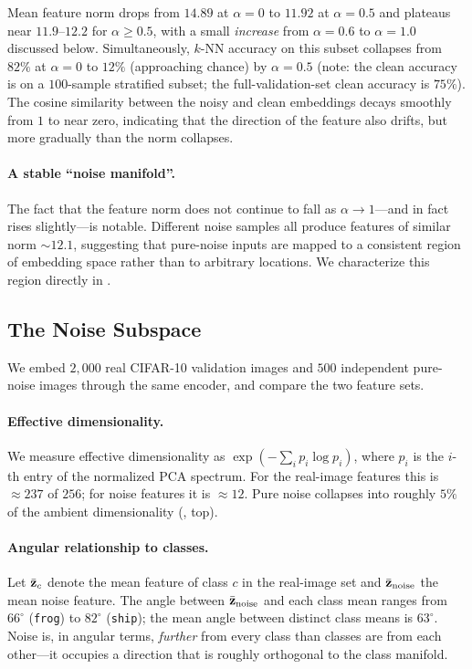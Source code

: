 Mean feature norm drops from $14.89$ at $\alpha = 0$ to $11.92$ at $\alpha = 0.5$ and plateaus near $11.9$--$12.2$ for $\alpha \ge 0.5$, with a small \emph{increase} from $\alpha = 0.6$ to $\alpha = 1.0$ discussed below. Simultaneously, $k$-NN accuracy on this subset collapses from $82\%$ at $\alpha = 0$ to $12\%$ (approaching chance) by $\alpha = 0.5$ (note: the clean accuracy is on a $100$-sample stratified subset; the full-validation-set clean accuracy is $75\%$). The cosine similarity between the noisy and clean embeddings decays smoothly from $1$ to near zero, indicating that the direction of the feature also drifts, but more gradually than the norm collapses.

\paragraph{A stable ``noise manifold''.} The fact that the feature norm does not continue to fall as $\alpha \to 1$---and in fact rises slightly---is notable. Different noise samples all produce features of similar norm $\sim 12.1$, suggesting that pure-noise inputs are mapped to a consistent region of embedding space rather than to arbitrary locations. We characterize this region directly in .

\subsection{The Noise Subspace}
\label{sec:noise_subspace}

We embed $2{,}000$ real CIFAR-10 validation images and $500$ independent pure-noise images through the same encoder, and compare the two feature sets.

\paragraph{Effective dimensionality.} We measure effective dimensionality as $\exp\!\left(-\sum_i p_i \log p_i\right)$, where $p_i$ is the $i$-th entry of the normalized PCA spectrum. For the real-image features this is $\approx 237$ of $256$; for noise features it is $\approx 12$. Pure noise collapses into roughly $5\%$ of the ambient dimensionality (, top).

\paragraph{Angular relationship to classes.} Let $\bar{\mathbf{z}}_c$ denote the mean feature of class $c$ in the real-image set and $\bar{\mathbf{z}}_\text{noise}$ the mean noise feature. The angle between $\bar{\mathbf{z}}_\text{noise}$ and each class mean ranges from $66^\circ$ (\texttt{frog}) to $82^\circ$ (\texttt{ship}); the mean angle between distinct class means is $63^\circ$. Noise is, in angular terms, \emph{further} from every class than classes are from each other---it occupies a direction that is roughly orthogonal to the class manifold.

